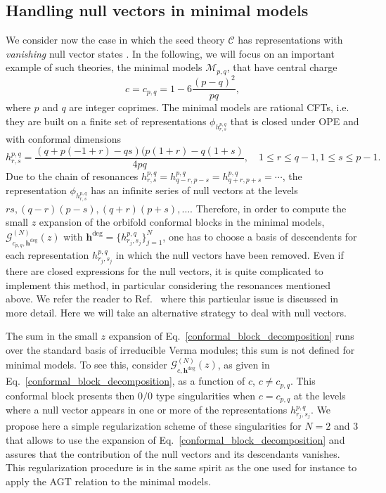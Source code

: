 \documentclass[a4paper,11pt]{article}
\begin{document}
\subsection{Handling null vectors in minimal models}
\label{null_vec1}
We consider now the case in which the seed theory $\mathcal{C}$ has representations with {\it vanishing} null vector states \cite{BPZ}. 
In the following, we will focus on an important example of such theories, the minimal models $\mathcal{M}_{p,q}$, that have central charge
\begin{equation}
c=c_{p,q}= 1 -6\frac{ (p-q)^2}{p q},
\end{equation}
where $p$ and $q$ are integer coprimes. The minimal models are rational CFTs, i.e. they are built on a finite set of representations $\phi_{h^{p,q}_{r,s}}$ that is closed under OPE and with conformal dimensions
 \begin{equation}
 h^{p,q}_{r,s}=\frac{(q + p (-1 + r) - q s) (p (1 + r) - q (1 + s)}{4 p q}, \quad 1\leq r\leq q-1,  1\leq s\leq p-1.
 \end{equation}
Due to the chain of resonances $h_{r,s}^{p, q}=h_{q-r,p-s}^{p, q}=h_{q+r,p+s}^{p, q}=\cdots$, the representation $\phi_{h^{p,q}_{r,s}}$ has an infinite series of null vectors at the levels $r s, (q-r)(p-s),(q+r)(p+s), \dots$. Therefore, in order to compute the small $z$ expansion of the orbifold conformal blocks in the minimal models, $\mathcal{G}_{c_{p,q}, \boldsymbol{h}^{\text{deg}}}^{(N)}(z)$ with $\boldsymbol{h}^{\text{deg}}=\{h_{r_j, s_j}^{p, q}\}_{j=1}^N$, one has to choose a basis of descendents for each representation $h_{r_j, s_j}^{p, q}$ in which the null vectors have been removed. Even if there are closed expressions for the null vectors, it is quite complicated to implement this method, in particular considering the resonances mentioned above. We refer the reader to Ref.~\cite{Javerzat} where this particular issue is discussed in more detail. Here we will take an alternative strategy to deal with null vectors.
 
The sum in the small $z$ expansion of Eq.~\eqref{conformal_block_decomposition} runs over the standard basis of irreducible Verma modules; this sum  is not defined for minimal models. To see this, consider $\mathcal{G}_{c, \boldsymbol{h}^{\text{deg}}}^{(N)}(z)$, as given in Eq.~\eqref{conformal_block_decomposition}, as a function of $c$, $c\neq c_{p,q}$.  This conformal block presents then $0/0$ type singularities when $c=c_{p, q}$ at the levels where a null vector appears in one or more of the representations $h_{r_j, s_j}^{p, q}$. We propose here a simple regularization scheme of these singularities for $N=2$ and $3$ that allows to use the expansion of Eq.~\eqref{conformal_block_decomposition} and assures that the contribution of the null vectors and its descendants vanishes. This regularization procedure is in the same spirit as the one used for instance to apply the AGT relation to the minimal models.
\end{document}
